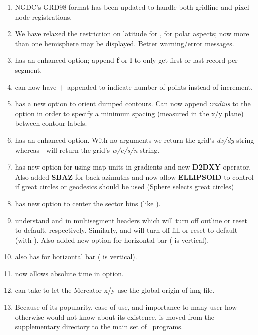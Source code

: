 \begin{enumerate}
\item NGDC's GRD98 format has been updated to handle both gridline and pixel node registrations.
\item We have relaxed the restriction on latitude for ,  for polar aspects; now more
than one hemisphere may be displayed.  Better warning/error messages.
\item {} has an enhanced  option; append \textbf{f} or \textbf{l}  to only get first or last record per segment.
\item {}  can now have \textbf{+} appended to indicate number of points instead of increment.
\item {} has a new option  to orient dumped contours.
Can now append :\emph{radius} to the  option in order to specify a minimum
spacing (measured in the x/y plane) between contour labels.
\item {} has an enhanced  option.  With no arguments we return the grid's \emph{dx/dy} string
whereas - will return the grid's \emph{w/e/s/n} string.
\item {} has new option  for using map units in gradients and new \textbf{D2DXY} operator.
Also added \textbf{SBAZ} for back-azimuths and now allow \textbf{ELLIPSOID} to control if great
circles or geodesics should be used (Sphere selects great circles)
\item {} has new  option to center the sector bins (like  ).
\item {} understand  and  in multisegment headers which will turn off outline or reset to default, respectively.
Similarly,  and  will turn off fill or reset to default (with ).
Also added new option  for horizontal bar ( is vertical).
\item {} also has  for horizontal bar ( is vertical).
\item {} now allows absolute time in  option.
\item {} can take  to let the Mercator x/y use the global origin of img file.
\item Because of its popularity, ease of use, and importance to many user how otherwise would not know about its
existence,  is moved from the supplementary  directory to the main set of \GMT\
programs.
\end{enumerate}

